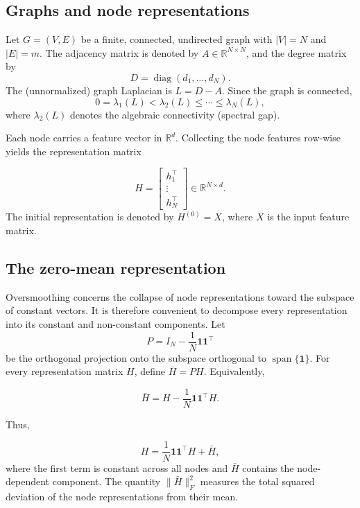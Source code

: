 \documentclass{article}
\begin{document}
\subsection{Graphs and node representations}

Let $G=(V,E)$
be a finite, connected, undirected graph with
$|V|=N$ and $|E|=m$. The adjacency matrix is denoted by
$A\in\mathbb{R}^{N\times N}$,
and the degree matrix by
\[
D=\operatorname{diag}(d_1,\ldots,d_N).
\]
The (unnormalized) graph Laplacian is
$
L=D-A$. 
Since the graph is connected,
\[
0=\lambda_1(L)
<
\lambda_2(L)
\le
\cdots
\le
\lambda_N(L),
\]
where $\lambda_2(L)$ denotes the algebraic connectivity (spectral gap).

Each node carries a feature vector in $\mathbb{R}^{d}$.
Collecting the node features row-wise yields the representation matrix

\[
H=
\begin{bmatrix}
	h_1^{\top}\\
	\vdots\\
	h_N^{\top}
\end{bmatrix}
\in
\mathbb{R}^{N\times d}.
\]
The initial representation is denoted by
$
H^{(0)}=X$,
where $X$ is the input feature matrix.

\subsection{The zero-mean representation}

Oversmoothing concerns the collapse of node representations toward the
subspace of constant vectors.
It is therefore convenient to decompose every representation into its
constant and non-constant components.
Let
\[
P
=
I_N
-
\frac1N
\mathbf1\mathbf1^{\top}
\]
be the orthogonal projection onto the subspace orthogonal to
$\operatorname{span}\{\mathbf1\}$.
For every representation matrix $H$, define
$
\bar H
=
PH$.
Equivalently,

\[
\bar H
=
H
-
\frac1N
\mathbf1\mathbf1^{\top}H.
\]

Thus,

\[
H
=
\frac1N
\mathbf1\mathbf1^{\top}H
+
\bar H,
\]
where the first term is constant across all nodes and
$\bar H$ contains the node-dependent component.
The quantity
$
\|\bar H\|_{F}^{2}
$
measures the total squared deviation of the node representations from their mean.
\end{document}
